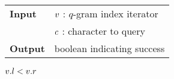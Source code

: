 \begin{figure*}[t]
\begin{center}
\begin{minipage}[t]{.6\textwidth}
\begin{algorithm}[H]
\begin{tabular}{ll}
\textbf{Input}  & $v$ : $q$-gram index iterator\\
				& $c$ : character to query\\
\textbf{Output} & boolean indicating success\\
\end{tabular}
\begin{algorithmic}[1]
	\State \Return \False
\EndIf
{}
\State \Return $v.l < v.r$
\end{algorithmic}
\label{alg:qgram-godownc}
\end{algorithm}
\end{minipage}
\end{center}
\end{figure*}



